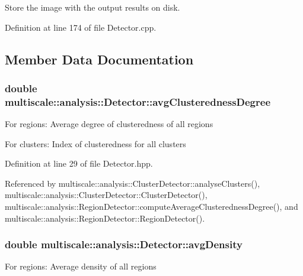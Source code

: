 \-Store the image with the output results on disk. 



\-Definition at line 174 of file \-Detector.\-cpp.



\subsection{\-Member \-Data \-Documentation}
\hypertarget{classmultiscale_1_1analysis_1_1Detector_a6d06607ae468a56e48f8daba0a00df5b}{
\subsubsection[{avg\-Clusteredness\-Degree}]{\setlength{\rightskip}{0pt plus 5cm}double {\bf multiscale\-::analysis\-::\-Detector\-::avg\-Clusteredness\-Degree}}}\label{classmultiscale_1_1analysis_1_1Detector_a6d06607ae468a56e48f8daba0a00df5b}
\-For regions\-: \-Average degree of clusteredness of all regions

\-For clusters\-: \-Index of clusteredness for all clusters 

\-Definition at line 29 of file \-Detector.\-hpp.



\-Referenced by multiscale\-::analysis\-::\-Cluster\-Detector\-::analyse\-Clusters(), multiscale\-::analysis\-::\-Cluster\-Detector\-::\-Cluster\-Detector(), multiscale\-::analysis\-::\-Region\-Detector\-::compute\-Average\-Clusteredness\-Degree(), and multiscale\-::analysis\-::\-Region\-Detector\-::\-Region\-Detector().

\hypertarget{classmultiscale_1_1analysis_1_1Detector_a411629d4cf34809127662d625ba057c0}{
\subsubsection[{avg\-Density}]{\setlength{\rightskip}{0pt plus 5cm}double {\bf multiscale\-::analysis\-::\-Detector\-::avg\-Density}}}\label{classmultiscale_1_1analysis_1_1Detector_a411629d4cf34809127662d625ba057c0}
\-For regions\-: \-Average density of all regions

